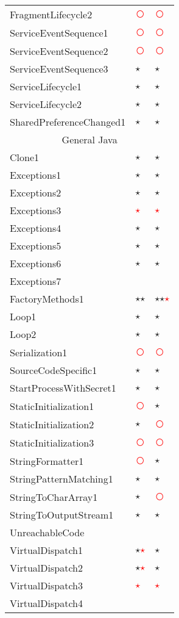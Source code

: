 \documentclass[../draft.tex]{subfiles}
\newcommand{\fp}{\textcolor{white}{\textcircled{\textcolor{red}{$\star$}}}}
\newcommand{\fn}{\textcolor{red}{\textcircled{ }}}
\newcommand{\tp}[0]{\textcircled{$\star$}}
\newcommand{\tsub}[1]{\multicolumn{3}{c}{#1}\\\hline}
\begin{document}
\begin{longtable}{l | l | l}
        FragmentLifecycle2 & \fn & \fn\\
        ServiceEventSequence1 & \fn & \fn\\
        ServiceEventSequence2 & \fn & \fn\\
        ServiceEventSequence3 & \tp & \tp\\
        ServiceLifecycle1 & \tp & \tp\\
        ServiceLifecycle2 & \tp & \tp\\
        SharedPreferenceChanged1 & \tp & \tp\\
        \hline
        \tsub{General Java}
        Clone1 & \tp & \tp\\
        Exceptions1 & \tp & \tp \\
        Exceptions2 & \tp & \tp\\
        Exceptions3 & \fp & \fp \\
        Exceptions4 & \tp & \tp \\
        Exceptions5 & \tp & \tp \\
        Exceptions6 & \tp & \tp\\
        Exceptions7 & &\\
        FactoryMethods1 & \tp \tp & \tp \tp \fp\\
        Loop1 & \tp & \tp\\
        Loop2 & \tp & \tp\\
        Serialization1 & \fn & \fn\\
        SourceCodeSpecific1 & \tp & \tp\\
        StartProcessWithSecret1 & \tp & \tp\\
        StaticInitialization1 & \fn & \tp\\
        StaticInitialization2 & \tp & \fn\\
        StaticInitialization3 & \fn & \fn\\
        StringFormatter1 & \fn & \tp\\
        StringPatternMatching1 & \tp & \tp\\
        StringToCharArray1 & \tp & \fn\\
        StringToOutputStream1 & \tp & \tp\\
        UnreachableCode & &\\
        VirtualDispatch1 & \tp \fp & \tp\\
        VirtualDispatch2 & \tp \fp & \tp\\
        VirtualDispatch3 & \fp & \fp\\
        VirtualDispatch4 & &\\

\end{longtable}
\end{document}
